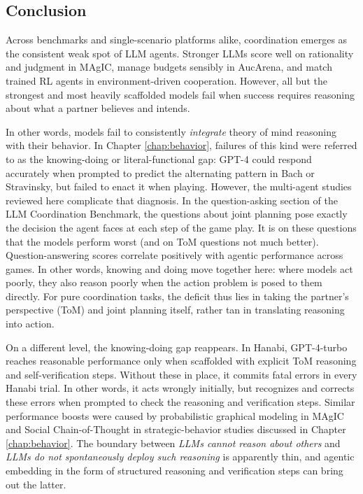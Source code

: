 \subsection{Conclusion}
Across benchmarks and single-scenario platforms alike, coordination emerges as the consistent weak spot of LLM agents. Stronger LLMs score well on rationality and judgment in MAgIC, manage budgets sensibly in AucArena, and match trained RL agents in environment-driven cooperation. However, all but the strongest and most heavily scaffolded models fail when success requires reasoning about what a partner believes and intends. 

In other words, models fail to consistently \emph{integrate} theory of mind reasoning with their behavior. In Chapter \ref{chap:behavior}, failures of this kind were referred to as the knowing-doing or literal-functional gap: GPT-4 could respond accurately when prompted to predict the alternating pattern in Bach or Stravinsky, but failed to enact it when playing. However, the multi-agent studies reviewed here complicate that diagnosis. In the question-asking section of the LLM Coordination Benchmark, the questions about joint planning pose exactly the decision the agent faces at each step of the game play. It is on these questions that the models perform worst (and on ToM questions not much better). Question-answering scores correlate positively with agentic performance across games. In other words, knowing and doing move together here: where models act poorly, they also reason poorly when the action problem is posed to them directly. For pure coordination tasks, the deficit thus lies in taking the partner's perspective (ToM) and joint planning itself, rather tan in translating reasoning into action.

On a different level, the knowing-doing gap  reappears. In Hanabi, GPT-4-turbo  reaches reasonable performance only when scaffolded with explicit ToM reasoning and self-verification steps. Without these in place, it commits fatal errors in every Hanabi trial. In other words, it acts wrongly initially, but recognizes and corrects these errors when prompted to check  the reasoning and verification steps. Similar performance boosts were caused by probabilistic graphical modeling in MAgIC and Social Chain-of-Thought in strategic-behavior studies discussed in Chapter \ref{chap:behavior}. The boundary between \emph{LLMs cannot reason about others} and \emph{LLMs do not spontaneously deploy such reasoning} is apparently thin, and agentic embedding in the form of structured reasoning and verification steps can bring out the latter. 

